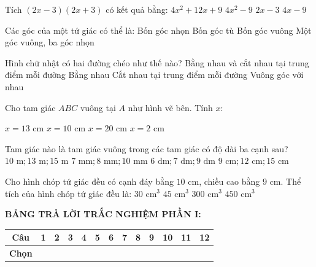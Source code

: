 \documentclass[12pt,a4paper]{article}
\begin{document}
\begin{ex}
Tích $(2x - 3)(2x + 3)$ có kết quả bằng:
\choice
{$4x^2 + 12x + 9$}
{\True $4x^2 - 9$}
{$2x - 3$}
{$4x - 9$}
\end{ex}

\begin{ex}
Các góc của một tứ giác có thể là:
\choice
{Bốn góc nhọn}
{Bốn góc tù}
{\True Bốn góc vuông}
{Một góc vuông, ba góc nhọn}
\end{ex}

\begin{ex}
Hình chữ nhật có hai đường chéo như thế nào?
\choice
{\True Bằng nhau và cắt nhau tại trung điểm mỗi đường}
{Bằng nhau}
{Cắt nhau tại trung điểm mỗi đường}
{Vuông góc với nhau}
\end{ex}

\begin{ex}
Cho tam giác $ABC$ vuông tại $A$ như hình vẽ bên. Tính $x$:
\begin{center}
\end{center}
\choice
{$x = 13\text{ cm}$}
{\True $x = 10\text{ cm}$}
{$x = 20\text{ cm}$}
{$x = 2\text{ cm}$}
\end{ex}

\begin{ex}
Tam giác nào là tam giác vuông trong các tam giác có độ dài ba cạnh sau?
\choice
{$10\text{ m}; 13\text{ m}; 15\text{ m}$}
{$7\text{ mm}; 8\text{ mm}; 10\text{ mm}$}
{$6\text{ dm}; 7\text{ dm}; 9\text{ dm}$}
{\True $9\text{ cm}; 12\text{ cm}; 15\text{ cm}$}
\end{ex}

\begin{ex}
Cho hình chóp tứ giác đều có cạnh đáy bằng $10\text{ cm}$, chiều cao bằng $9\text{ cm}$. Thể tích của hình chóp tứ giác đều là:
\choice
{$30\text{ cm}^3$}
{$45\text{ cm}^3$}
{\True $300\text{ cm}^3$}
{$450\text{ cm}^3$}
\end{ex}


\vspace{1mm}
\noindent\textbf{BẢNG TRẢ LỜI TRẮC NGHIỆM PHẦN I:}
\begin{center}
\begin{tabular}{|c|c|c|c|c|c|c|c|c|c|c|c|c|}
\hline
\textbf{Câu} & \textbf{1} & \textbf{2} & \textbf{3} & \textbf{4} & \textbf{5} & \textbf{6} & \textbf{7} & \textbf{8} & \textbf{9} & \textbf{10} & \textbf{11} & \textbf{12} \\
\hline
\textbf{Chọn} & \rule{0pt}{0.65cm} & & & & & & & & & & & \\
\hline
\end{tabular}
\end{center}
\vspace{2mm}
\end{document}
